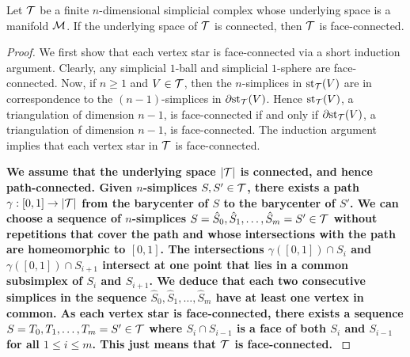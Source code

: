 \documentclass[10pt,a4paper]{article}
\newcommand{\todo}[1]{{\color{RedOrange}\textbf{#1}}}
\begin{document}
\begin{lemma}\label{lemma:connectivity}
    Let ${\mathcal T}$ be a finite $n$-dimensional simplicial complex whose underlying space is a manifold ${\mathcal M}$.
    If the underlying space of ${\mathcal T}$ is connected, then ${\mathcal T}$ is face-connected.
\end{lemma}
\begin{proof}
    We first show that each vertex star is face-connected via a short induction argument.
    Clearly, any simplicial $1$-ball and simplicial $1$-sphere are face-connected. 
    Now, if $n \geq 1$ and $V \in {\mathcal T}$,
    then the $n$-simplices in $\operatorname{st}_{{\mathcal T}}(V)$ are in correspondence to the $(n-1)$-simplices in ${\partial \rm st}_{{\mathcal T}}(V)$.
    Hence $\operatorname{st}_{{\mathcal T}}(V)$, a triangulation of dimension $n-1$, is face-connected if and only if ${\partial \rm st}_{{\mathcal T}}(V)$, a triangulation of dimension $n-1$, is face-connected.
    The induction argument implies that each vertex star in ${\mathcal T}$ is face-connected.

    
    \todo{
    We assume that the underlying space $\left| {\mathcal T} \right|$ is connected, and hence path-connected. 
    Given $n$-simplices $S,S' \in {\mathcal T}$, 
    there exists a path $\gamma : [0,1] \rightarrow \left| {\mathcal T} \right|$ from the barycenter of $S$ to the barycenter of $S'$.
    We can choose a sequence of $n$-simplices $S = \hat S_0,\hat S_1,\dots,\hat S_m=S' \in {\mathcal T}$ without repetitions 
    that cover the path and whose intersections with the path are homeomorphic to $[0,1]$.
    The intersections $\gamma([0,1]) \cap S_{i}$ and $\gamma([0,1]) \cap S_{i+1}$ intersect at one point that lies in a common subsimplex of $S_{i}$ and $S_{i+1}$.
    We deduce that each two consecutive simplices in the sequence $\hat S_0,\hat S_1,\dots,\hat S_m$ have at least one vertex in common. 
    As each vertex star is face-connected, 
    there exists a  sequence $S=T_0,T_1,\dots,T_{m}=S' \in {\mathcal T}$ 
    where $S_{i} \cap S_{i-1}$ is a face of both $S_{i}$ and $S_{i-1}$ for all $1 \leq i \leq m$.
    This just means that ${\mathcal T}$ is face-connected. 
    }
    

\end{proof}
\end{document}
